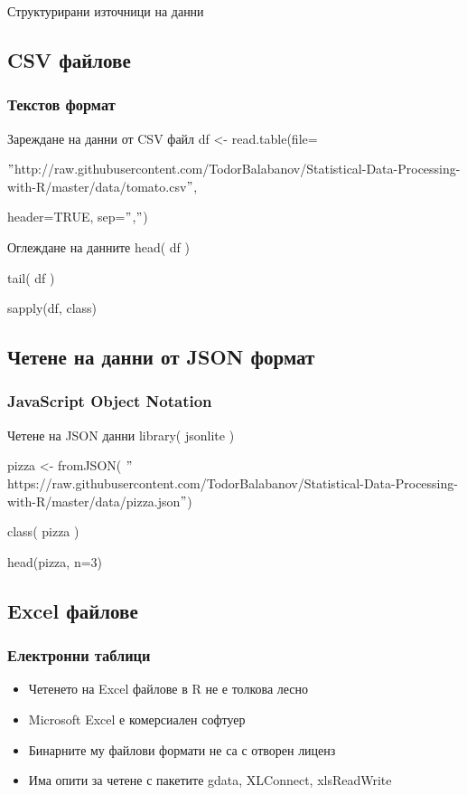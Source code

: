 \documentclass{beamer}
\begin{document}
\begin{frame}
\center \huge{Структурирани източници на данни}
\end{frame}

\subsection{CSV файлове}

\begin{frame}
\frametitle{Текстов формат}
\begin{block}{Зареждане на данни от CSV файл}
df <- read.table(file=

$"$http://raw.githubusercontent.com/TodorBalabanov/Statistical-Data-Processing-with-R/master/data/tomato.csv$"$,

header=TRUE, sep=$"$,$"$)
\end{block}
 
\begin{block}{Оглеждане на данните}
head( df )
 
tail( df ) 

sapply(df, class)
\end{block}
\end{frame}

\subsection{Четене на данни от JSON формат}

\begin{frame}
\frametitle{JavaScript Object Notation}
\begin{block}{Четене на JSON данни}
library( jsonlite )
 
pizza <- fromJSON( $"$https://raw.githubusercontent.com/TodorBalabanov/Statistical-Data-Processing-with-R/master/data/pizza.json$"$)

class( pizza )

head(pizza, n=3)
\end{block}
\end{frame}

\subsection{Excel файлове}

\begin{frame}
\frametitle{Електронни таблици}
\begin{itemize}
	\item Четенето на Excel файлове в R не е толкова лесно
	\item Microsoft Excel е комерсиален софтуер
	\item Бинарните му файлови формати не са с отворен лиценз
	\item Има опити за четене с пакетите gdata, XLConnect, xlsReadWrite
\end{itemize}
\end{frame}
\end{document}
